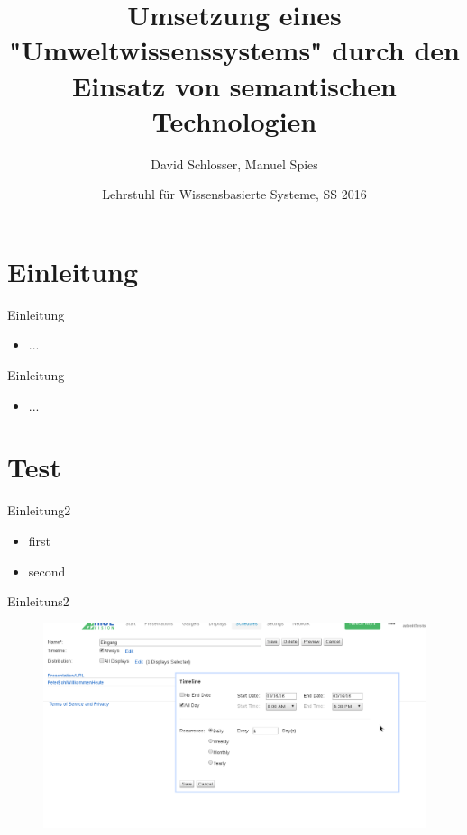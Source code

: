 \documentclass[aspectratio=169]{beamer}
\title[Umwelt PG]{%
  Umsetzung eines "Umweltwissenssystems" durch den Einsatz von semantischen Technologien}
\subtitle{}
\author[David Schlosser, Manuel Spies]{%
  David Schlosser, Manuel Spies}
\date[Lehrstuhl für Wissensbasierte Systeme, SS 2016]{Lehrstuhl für Wissensbasierte Systeme, SS 2016}
\begin{document}
\begin{frame}
  \maketitle
\end{frame}

\section{Einleitung}

\begin{frame}{Einleitung}
  \begin{itemize}
    \item ...
  \end{itemize}
\end{frame}

\begin{frame}{Einleitung}
  \begin{itemize}
    \item ...
  \end{itemize}
\end{frame}

\section{Test}

\begin{frame}{Einleitung2}
  \begin{itemize}
  	\item first
  	\item second
  \end{itemize}
\end{frame}

\begin{frame}{Einleituns2}
  \begin{figure}[ht]
  	\includegraphics[scale=0.2]{pics/RiseVision.png}
  \end{figure}
\end{frame}
\end{document}
